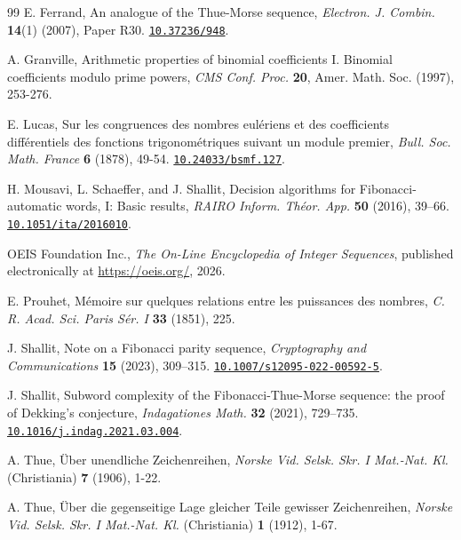 \documentclass[12pt,reqno]{article}
\newcommand{\doi}[1]{\href{https://doi.org/#1}{\nolinkurl{#1}}}
\theoremstyle{plain}
\theoremstyle{definition}
\begin{document}
\begin{thebibliography}{99}
E. Ferrand,
An analogue of the Thue-Morse sequence,
\textit{Electron. J. Combin.} \textbf{14}(1) (2007), Paper R30.
\doi{10.37236/948}.

A. Granville,
Arithmetic properties of binomial coefficients I. Binomial coefficients modulo prime powers,
\textit{CMS Conf. Proc.} \textbf{20}, Amer. Math. Soc. (1997), 253-276.

E. Lucas,
Sur les congruences des nombres eul\'eriens et des coefficients diff\'erentiels des fonctions trigonom\'etriques suivant un module premier,
\textit{Bull. Soc. Math. France} \textbf{6} (1878), 49-54.
\doi{10.24033/bsmf.127}.

H. Mousavi, L. Schaeffer, and J. Shallit,
Decision algorithms for Fibonacci-automatic words, I: Basic results,
\textit{RAIRO Inform. Th\'eor. App.} \textbf{50} (2016), 39--66.
\doi{10.1051/ita/2016010}.

OEIS Foundation Inc.,
\textit{The On-Line Encyclopedia of Integer Sequences},
published electronically at \url{https://oeis.org/}, 2026.

E. Prouhet,
M\'emoire sur quelques relations entre les puissances des nombres,
\textit{C. R. Acad. Sci. Paris S\'er. I} \textbf{33} (1851), 225.

J. Shallit,
Note on a Fibonacci parity sequence,
\textit{Cryptography and Communications} \textbf{15} (2023), 309--315.
\doi{10.1007/s12095-022-00592-5}.

J. Shallit,
Subword complexity of the Fibonacci-Thue-Morse sequence:
the proof of Dekking's conjecture,
\textit{Indagationes Math.} \textbf{32} (2021), 729--735.
\doi{10.1016/j.indag.2021.03.004}.

A. Thue,
\"Uber unendliche Zeichenreihen,
\textit{Norske Vid. Selsk. Skr. I Mat.-Nat. Kl.}
(Christiania) \textbf{7} (1906), 1-22.

A. Thue,
\"Uber die gegenseitige Lage gleicher Teile gewisser Zeichenreihen,
\textit{Norske Vid. Selsk. Skr. I Mat.-Nat. Kl.}
(Christiania) \textbf{1} (1912), 1-67.

\end{thebibliography}
\end{document}
